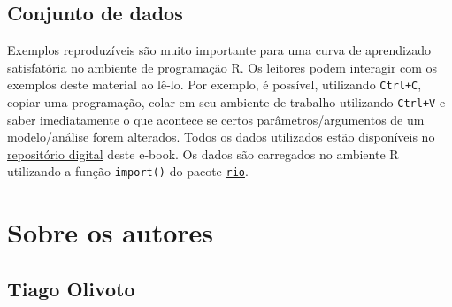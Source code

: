 \documentclass[
]{book}
\begin{document}
\hypertarget{conjunto-de-dados}{%
\section*{Conjunto de dados}\label{conjunto-de-dados}}

Exemplos reproduzíveis são muito importante para uma curva de aprendizado satisfatória no ambiente de programação R. Os leitores podem interagir com os exemplos deste material ao lê-lo. Por exemplo, é possível, utilizando \texttt{Ctrl+C}, copiar uma programação, colar em seu ambiente de trabalho utilizando \texttt{Ctrl+V} e saber imediatamente o que acontece se certos parâmetros/argumentos de um modelo/análise forem alterados. Todos os dados utilizados estão disponíveis no \href{https://github.com/TiagoOlivoto/e-bookr/tree/master/data}{repositório digital} deste e-book. Os dados são carregados no ambiente R utilizando a função \texttt{import()} do pacote \href{https://cran.r-project.org/web/packages/rio/index.html}{\texttt{rio}}.

\hypertarget{sobre-os-autores}{%
\chapter*{Sobre os autores}\label{sobre-os-autores}}

\hypertarget{tiago-olivoto}{%
\section*{Tiago Olivoto}\label{tiago-olivoto}}
\end{document}
